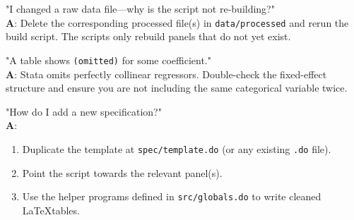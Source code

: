 \documentclass[11pt]{article}
\newcommand{\code}[1]{\texttt{#1}}
\begin{document}
\begin{description}[style=unboxed,leftmargin=0.6in]
  \item[\textsc{Q}:] "I changed a raw data file—why is the script not
        re-building?"\\
        \textbf{A}: Delete the corresponding processed file(s) in
        \code{data/processed} and rerun the build script.  The scripts only
        rebuild panels that do not yet exist.

  \item[\textsc{Q}:] "A table shows \code{(omitted)} for some coefficient."\\
        \textbf{A}: Stata omits perfectly collinear regressors.  Double-check
        the fixed-effect structure and ensure you are not including the same
        categorical variable twice.

  \item[\textsc{Q}:] "How do I add a new specification?"\\
        \textbf{A}:
        \begin{enumerate}
          \item Duplicate the template at \code{spec/template.do} (or any
                existing \code{.do} file).
          \item Point the script towards the relevant panel(s).
          \item Use the helper programs defined in \code{src/globals.do} to
                write cleaned \LaTeX tables.
        \end{enumerate}
\end{description}
\end{document}
